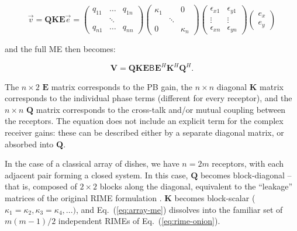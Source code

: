 \documentclass[]{aa}
\newcommand{\herm}{H}
\newcommand{\coh}[2]{\mathsf{{#1}}_{{#2}}}
\begin{document}
\begin{equation}\label{eq:array-response}
\vec v = \mathbf{QKE} \vec e =\left(\begin{array}{ccc}
q_{11} & \ldots & q_{1n}\\
 & \ddots\\
q_{n1} & \ldots & q_{nn}\end{array}\right)\left(\begin{array}{ccc}
\kappa_{1} &  & 0\\
 & \ddots & \\
0 &  & \kappa_{n}\end{array}\right)\left(\begin{array}{cc}
\epsilon_{x1} & \epsilon_{y1}\\
\vdots & \vdots\\
\epsilon_{xn} & \epsilon_{yn}\end{array}\right) 
\left(\begin{array}{c} e_x\\e_y
\end{array}\right)
\end{equation}


and the full ME then becomes:

\begin{equation}
\mathbf{V} = \mathbf{QKE} \coh{B}{} \mathbf{E}^\herm \mathbf{K}^\herm \mathbf{Q}^\herm.
\label{eq:array-me}
\end{equation}


The $n\times2$ \textbf{$\mathbf{E}$} matrix corresponds to the PB gain,
the $n\times n$ diagonal $\mathbf{K}$ matrix corresponds to the individual
phase terms (different for every receptor), and the $n\times n$ $\mathbf{Q}$
matrix corresponds to the cross-talk and/or mutual coupling between the
receptors. The equation does not include an explicit term for the 
complex receiver gains: these can be described either by a separate diagonal matrix,
or absorbed into $\mathbf{Q}$.

In the case of a classical array of dishes, we have $n=2m$ receptors, with each
adjacent pair forming a closed system. In this case, $\mathbf{Q}$ becomes block-diagonal -- that is, composed of $2\times2$ blocks along the diagonal, equivalent to the ``leakage'' matrices of the original RIME formulation \citep{ME1}. $\mathbf{K}$ becomes block-scalar ($\kappa_{1}=\kappa_{2},\kappa_{3}=\kappa_{4},...)$, and Eq.~(\ref{eq:array-me}) 
dissolves into the familiar set of $m(m-1)/2$ independent RIMEs of Eq.~(\ref{eq:rime-onion}).
\end{document}
